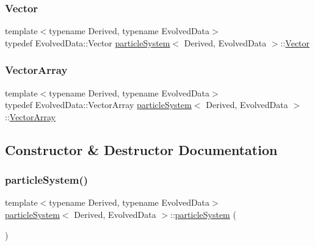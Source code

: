 \mbox{\label{classparticle_system_ab7ee6005b0bed27658db2fa983def5ec}} 
\subsubsection{\texorpdfstring{Vector}{Vector}}
{\footnotesize\ttfamily template$<$typename Derived, typename Evolved\+Data$>$ \\
typedef Evolved\+Data\+::\+Vector \mbox{\hyperlink{classparticle_system}{particle\+System}}$<$ Derived, Evolved\+Data $>$\+::\mbox{\hyperlink{classparticle_system_ab7ee6005b0bed27658db2fa983def5ec}{Vector}}}

\mbox{\label{classparticle_system_a6f66ed187a286c0d42ab2f83b8b6193b}} 
\subsubsection{\texorpdfstring{Vector\+Array}{VectorArray}}
{\footnotesize\ttfamily template$<$typename Derived, typename Evolved\+Data$>$ \\
typedef Evolved\+Data\+::\+Vector\+Array \mbox{\hyperlink{classparticle_system}{particle\+System}}$<$ Derived, Evolved\+Data $>$\+::\mbox{\hyperlink{classparticle_system_a6f66ed187a286c0d42ab2f83b8b6193b}{Vector\+Array}}}



\subsection{Constructor \& Destructor Documentation}
\mbox{\label{classparticle_system_a6fcdf55bb3999bde562ef2ba22693c6d}} 
\subsubsection{\texorpdfstring{particle\+System()}{particleSystem()}}
{\footnotesize\ttfamily template$<$typename Derived, typename Evolved\+Data$>$ \\
\mbox{\hyperlink{classparticle_system}{particle\+System}}$<$ Derived, Evolved\+Data $>$\+::\mbox{\hyperlink{classparticle_system}{particle\+System}} (\begin{DoxyParamCaption}{ }\end{DoxyParamCaption})\hspace{0.3cm}{\ttfamily [inline]}}



